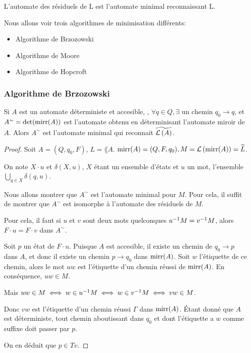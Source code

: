 L'automate des résiduels de L est l'automate minimal reconnaissant L.


Nous allons voir trois algorithmes de minimisation différents:
\begin{itemize}
	\item Algorithme de Brzozowski
	\item Algorithme de Moore
	\item Algorithme de Hopcroft
\end{itemize}


\subsubsection{Algorithme de Brzozowski}

\begin{prop}
	Si $A$ est un automate déterministe et accesible, \ie, $\forall q \in Q, \exists \text{ un chemin } q_0 \to q$,
	et  $A^ {\sim} = \text{det} (\text{mirr}(A)) $ est l'automate obtenu en déterminisant l'automate miroir de $A$. Alors
	$A^{\sim}$ est l'automate minimal qui reconnait $\widetilde{\mathcal{L}\left(A\right)}$.
\end{prop}


\begin{proof}
	Soit $A = (Q, q_0, F)$, $L = \lang A$. $\text{mirr} (A) = (Q, F, q_0), M = \mathcal{L}\left(\text{mirr} (A)\right) = \widetilde{L}$.

	On note $X \cdot u$ et $\delta (X,u)$, $X$ étant un ensemble d'états et $u$ un mot, l'ensemble $\bigcup\limits_{q \in X} \delta (q,u)$.

	Nous allons montrer que $A^{\sim}$ est l'automate minimal pour $M$. Pour cela, il suffit de montrer que $A^{\sim}$
	est isomorphe à l'automate des résiduels de $M$.

	Pour cela, il faut \mq si $u$ et $v$ sont deux mots quelconques \tq $u^{-1} M = v^{-1} M$, alors $F \cdot u =  F \cdot v$ dans $A^{\sim}$.

	Soit $p$ un état de $F \cdot u$. Puisque $A$ est accesible, il existe un chemin de $q_0 \to p$ dans $A$, et donc il existe un chemin $p \to q_0$ dans $\text{mirr}(A)$.
	Soit $w$ l'étiquette de ce chemin, alors le mot $uw$ est l'étiquette d'un chemin réussi de $\text{mirr} (A)$. En conséquence, $uw \in M$.

	Mais $uw\in M \iff w \in u^{-1} M \iff w\in v^{-1} M \iff vw \in M$.

	Donc $vw$ est l'étiquette d'un chemin réussi $\Gamma$ dans $\text{mirr} (A)$. Étant donné que $A$ est déterministe, tout chemin aboutissant dans $q_0$
	et dont l'étiquette a $w$ comme suffixe doit passer par $p$.

	On en  déduit que $p \in Tv$.
\end{proof}


